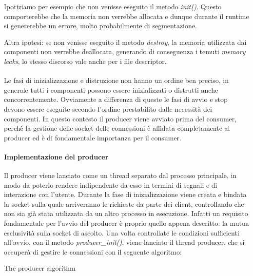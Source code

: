 \documentclass[]{article}
\begin{document}
Ipotiziamo per esempio che non venisse eseguito il metodo \textit{init()}.
Questo comporterebbe che la memoria non verrebbe allocata 
e dunque durante il runtime si genererebbe un errore, molto probabilmente
di segmentazione.

Altra ipotesi: se non venisse eseguito il metodo \textit{destroy},
la memoria utilizzata dai componenti non verrebbe deallocata,
generando di conseguenza i temuti \textit{memory leaks}, lo stesso discorso
vale anche per i file descriptor.
\\
\\
Le fasi di inizializzazione e distruzione non hanno un ordine ben preciso,
in generale tutti i componenti possono essere inizializzati o distrutti
anche concorrentemente. Ovviamente a differenza di queste le fasi
di avvio e stop devono essere eseguite secondo l'ordine prestabilito
dalle necessit\`a dei componenti.
In questo contesto il producer viene avviato prima del consumer, perch\`e
la gestione delle socket delle connessioni \`e affidata completamente al
producer ed \`e di fondamentale importanza per il consumer.

\paragraph{Implementazione del producer}
Il producer viene lanciato come un thread separato dal processo principale,
in modo da poterlo rendere indipendente da esso in termini di segnali e di interazione con l'utente.
Durante la fase di inizializzazione viene creata e bindata la socket sulla quale
arriveranno le richieste da parte dei client, controllando che non sia gi\`a stata
utilizzata da un altro processo in esecuzione.
Infatti un requisito fondamentale per l'avvio del producer \`e proprio quello appena descritto: la mutua esclusivit\`a sulla socket di ascolto.
Una volta controllate le condizioni sufficienti all'avvio, con il  metodo \textit{producer\_init()}, viene lanciato il thread producer,
che si occuper\`a di gestire le connessioni con il seguente algoritmo:

\begin{algorithm}[H] 
	\caption{The producer algorithm}
\end{algorithm}
\end{document}
